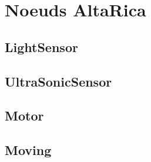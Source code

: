  \section{Noeuds AltaRica}
 
  \subsection{LightSensor}
  

  \subsection{UltraSonicSensor}
  

  \subsection{Motor}
  

  \subsection{Moving}
  

